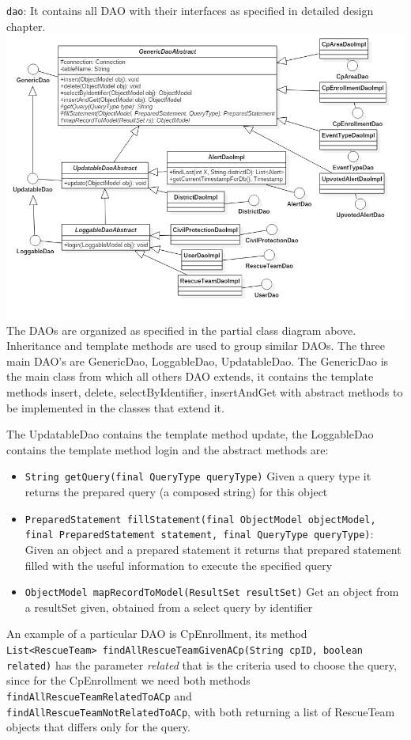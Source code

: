 \documentclass[a4paper,12pt]{report}
\begin{document}
\texttt{dao}: It contains all DAO with their interfaces as specified in detailed design chapter.\\
\includegraphics[width=\textwidth]{figures/ClassDiagram.jpg}
The DAOs are organized as specified in the partial class diagram above. Inheritance and template methods are used to group similar DAOs. The three main DAO's are GenericDao, LoggableDao, UpdatableDao. The GenericDao is the main class from which all others DAO extends, it contains the template methods insert, delete, selectByIdentifier, insertAndGet with abstract methods to be implemented in the classes that extend it.

The UpdatableDao contains the template method update, the LoggableDao contains the template method login and the abstract methods are:
\begin{itemize}
\item \texttt{String getQuery(final QueryType queryType)} Given a query type it returns the prepared query (a composed string) for this object
\item \texttt{PreparedStatement fillStatement(final ObjectModel objectModel, \\final PreparedStatement statement, final QueryType queryType)}: Given an object and a prepared statement it returns that prepared statement filled with the useful information to execute the specified query
\item \texttt{ObjectModel mapRecordToModel(ResultSet resultSet)} Get an object from a resultSet given, obtained from a select query by identifier
\end{itemize}

An example of a particular DAO is CpEnrollment, its method \\
\texttt{List<RescueTeam> findAllRescueTeamGivenACp(String cpID, boolean related)} has the parameter \textit{related} that is the criteria used to choose the query, since for the CpEnrollment we need both methods \texttt{findAllRescueTeamRelatedToACp} and \\
\texttt{findAllRescueTeamNotRelatedToACp}, with both returning a list of RescueTeam objects that differs only for the query. \\
\end{document}
